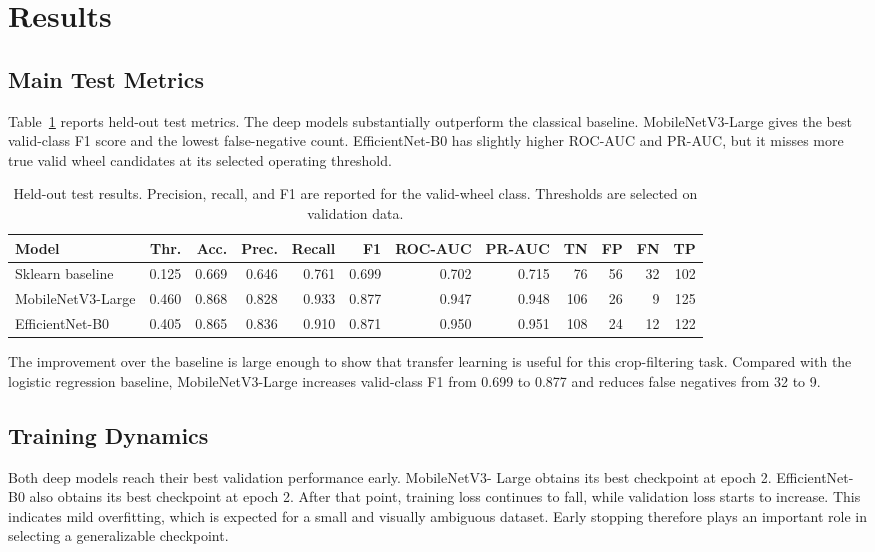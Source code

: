 \documentclass[letterpaper, 10 pt]{IEEEconf}
\begin{document}
\section{Results}

\subsection{Main Test Metrics}

Table~\ref{tab:results} reports held-out test metrics. The deep models
substantially outperform the classical baseline. MobileNetV3-Large gives the
best valid-class F1 score and the lowest false-negative count. EfficientNet-B0
has slightly higher ROC-AUC and PR-AUC, but it misses more true valid wheel
candidates at its selected operating threshold.

\begin{table}[t]
\caption{Held-out test results. Precision, recall, and F1 are reported for the
valid-wheel class. Thresholds are selected on validation data.}
\label{tab:results}
\centering
\small
\begin{tabular}{lrrrrrrrrrrr}
\toprule
Model & Thr. & Acc. & Prec. & Recall & F1 & ROC-AUC & PR-AUC & TN & FP & FN & TP \\
\midrule
Sklearn baseline & 0.125 & 0.669 & 0.646 & 0.761 & 0.699 & 0.702 & 0.715 & 76 & 56 & 32 & 102 \\
MobileNetV3-Large & 0.460 & 0.868 & 0.828 & 0.933 & 0.877 & 0.947 & 0.948 & 106 & 26 & 9 & 125 \\
EfficientNet-B0 & 0.405 & 0.865 & 0.836 & 0.910 & 0.871 & 0.950 & 0.951 & 108 & 24 & 12 & 122 \\
\bottomrule
\end{tabular}
\end{table}

The improvement over the baseline is large enough to show that transfer
learning is useful for this crop-filtering task. Compared with the logistic
regression baseline, MobileNetV3-Large increases valid-class F1 from 0.699 to
0.877 and reduces false negatives from 32 to 9.

\subsection{Training Dynamics}

Both deep models reach their best validation performance early. MobileNetV3-
Large obtains its best checkpoint at epoch 2. EfficientNet-B0 also obtains its
best checkpoint at epoch 2. After that point, training loss continues to fall,
while validation loss starts to increase. This indicates mild overfitting, which
is expected for a small and visually ambiguous dataset. Early stopping therefore
plays an important role in selecting a generalizable checkpoint.
\end{document}
